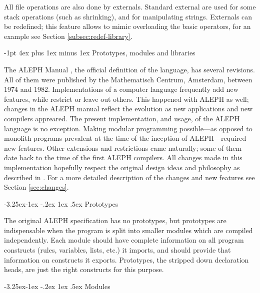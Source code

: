 \documentclass[titlepage]{article}
\makeatletter
\newcommand\A{\textsf{ALEPH}}
\renewcommand\subsection{%
\@startsection{subsection}{2}{\z@}%
   {-3.25ex\@plus -1ex \@minus -.2ex}%
   {1ex \@plus .5ex}%
   {\normalfont\normalsize\bfseries}}
\renewcommand\section{%
\newpage
\@startsection{section}{1}{\z@}%
   {-1pt}%
   {4ex plus 1ex minus 1ex}%
   {\normalfont\Large\bfseries}}
\let\osection\section
\def\section {\newpage\osection}
\makeatother
\begin{document}
All file operations are also done by externals. Standard external are used
for some stack operations (such as shrinking), and for manipulating strings.
Externals can be redefined; this feature allows to mimic overloading the
basic operators, for an example see Section \ref{subsec:redef-library}.


\section{Prototypes, modules and libraries}

The \A{} Manual \cite{A-manual}, the official definition of the language,
has several revisions. All of them were published by the Mathematisch
Centrum, Amsterdam, between 1974 and 1982. Implementations of a computer
language frequently add new features, while restrict or leave out others.
This happened with \A{} as well; changes in the \A{} manual reflect the
evolution as new applications and new compilers appreared. The present
implementation, and usage, of the \A{} language is no exception. Making
modular programming possible---as opposed to monolith programs
prevalent at the time of the inception of \A---required new features. Other
extensions and restrictions came naturally; some of them date back to the
time of the first \A{} compilers. All changes made in this implementation
hopefully respect the original design ideas and philosophy as described in
\cite{grune}. For a more detailed description of the changes and new features see
Section \ref{sec:changes}.

\subsection{Prototypes}

The original \A{} specification has no prototypes, but prototypes are
indispensable when the program is split into smaller modules which are
compiled independently. Each module should have complete information on all
program constructs (rules, variables, lists, etc.) it imports, and should
provide that information on constructs it exports. Prototypes, the stripped
down declaration heads, are just the right constructs for this purpose.

\subsection{Modules}\label{subsec:general-modules}
\end{document}
